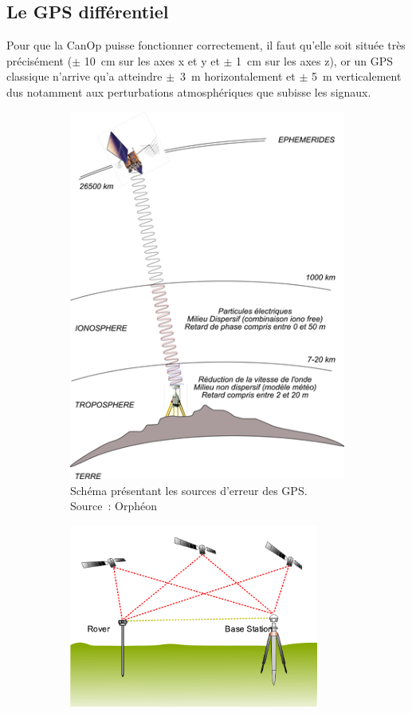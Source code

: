 \subsection{Le GPS différentiel}
\label{ssec_Gps_differenciel}
Pour que la CanOp puisse fonctionner correctement, il faut qu'elle soit située très précisément ($\pm$ 10~cm sur les axes x et y et $\pm$ 1~cm sur les axes z), or un GPS classique n'arrive qu’a atteindre $\pm$~3~m horizontalement et $\pm$ 5~m verticalement dus notamment aux perturbations atmosphériques que subisse les signaux. 
\begin{figure}
    
    \begin{subfigure}[t]{0.5\textwidth}
        \centering
        \includegraphics[height=0.9\textwidth]{img/she/GPS-mode-Naturel-5-10m.png}
        
        \caption[Source d'erreur des GPS]{Schéma présentant les sources d'erreur des GPS. Source~: Orphéon}
        \label{fig_GPS_error_source}
    \end{subfigure}
    \begin{subfigure}[t]{0.5\textwidth}
        \centering
        \includegraphics[width=0.9\textwidth]{img/she/Real_time_kinematic.png}
        

\end{subfigure}
\end{figure}
